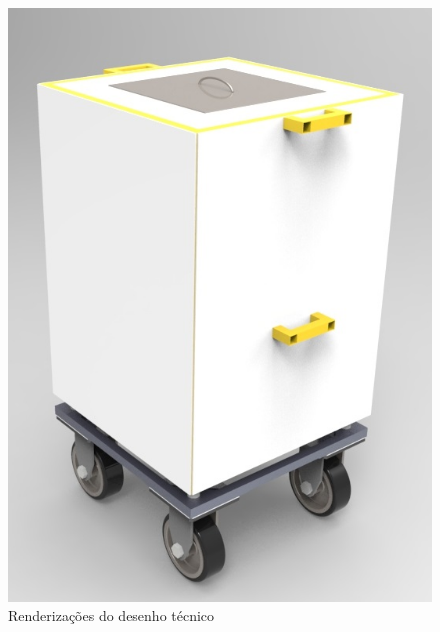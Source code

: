 \begin{figure}[H]
	\includegraphics[scale=.5]{figuras/render_3.jpg}
	\caption{Renderizações do desenho técnico}
\end{figure}




